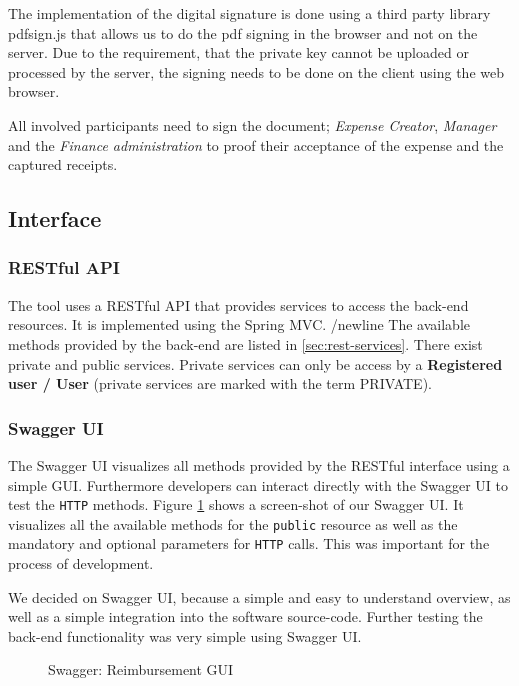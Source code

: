 The implementation of the digital signature is done using a third party library pdfsign.js \cite{pdfsign} that allows us to do the pdf signing in the browser and not on the server. Due to the requirement, that the private key cannot be uploaded or processed by the server, the signing needs to be done on the client using the web browser.\par

All involved participants need to sign the document; \textit{Expense Creator}, \textit{Manager} and the \textit{Finance administration} to proof their acceptance of the expense and the captured receipts. \par

\subsection{Interface}

\subsubsection{RESTful API}
\label{sec:restfulapi}
The tool uses a RESTful API that provides services to access the back-end resources. It is implemented using the Spring MVC. /newline
The available methods provided by the back-end are listed in \ref{sec:rest-services}. There exist private and public services. Private services can only be access by a \textbf{Registered user / User} (private services are marked with the term PRIVATE).

\subsubsection{Swagger UI}
The Swagger UI visualizes all methods provided by the RESTful interface using a simple GUI. Furthermore developers can interact directly with the Swagger UI to test the \texttt{HTTP} methods. Figure \ref{fig:swagger01} shows a screen-shot of our Swagger UI. It visualizes all the available methods for the \texttt{public} resource as well as the mandatory and optional parameters for \texttt{HTTP} calls. This was important for the process of development. \cite{swagger} \par
We decided on Swagger UI, because a simple and easy to understand overview, as well as a simple integration into the software source-code. Further testing the back-end functionality was very simple using Swagger UI.

\begin{figure}[H]
    \centering
    \caption{Swagger: Reimbursement GUI}
    \label{fig:swagger01}
\end{figure}

